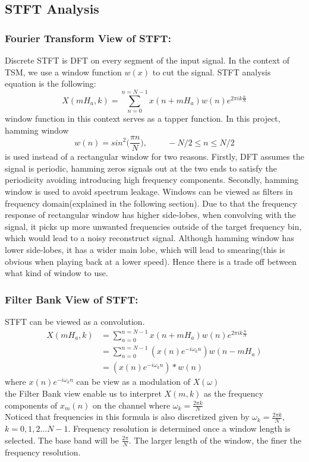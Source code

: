 \documentclass{article}
\begin{document}
\subsection{STFT Analysis}
\subsubsection{Fourier Transform View of STFT:}
Discrete STFT is DFT on every segment of the input signal. In the context of TSM, we use a window function $w(x)$ to cut the signal. STFT analysis equation is the following:
\begin{equation}
        X(mH_a,k) = \sum_{n=0}^{n= N-1} x(n+mH_a) w(n) e^{2 \pi ik \frac{n}{N}} 
\end{equation}
window function in this context serves as a tapper function. In this project, hamming window 
\[
w(n) = sin^2\bigg(\frac{\pi n}{N} \bigg), \hspace{1cm} -N/2 \leq n \leq N/2
\]
is used instead of a rectangular window for two reasons. Firstly, DFT assumes the signal is periodic, hamming zeros signals out at the two ends to satisfy the periodicity avoiding introducing high frequency components. Secondly, hamming window is used to avoid spectrum leakage. Windows can be viewed as filters in frequency domain(explained in the following section). Due to that the frequency response of rectangular window has higher side-lobes, when convolving with the signal, it picks up more unwanted frequencies outside of the target frequency bin, which would lead to a noisy reconstruct signal. Although hamming window has lower side-lobes, it has a wider main lobe, which will lead to smearing(this is obvious when playing back at a lower speed). Hence there is a trade off between what kind of window to use.
\subsubsection{Filter Bank View of STFT:}
STFT can be viewed as a convolution.\\ 
\[
        \begin{aligned}
        X(mH_a,k) &= \sum_{n=0}^{n= N-1} x(n+mH_a) w(n) e^{2 \pi ik \frac{n}{N}}\\ 
                  &=\sum_{n=0}^{n=N-1}(x(n)e^{-i\omega_k n})w(n-mH_a)\\
                  &=  (x(n) e^{-i\omega_k n} )* w(n)
\end{aligned}
\]
where  $x(n) e^{-i\omega_k n}$ can be view as a modulation of $X(\omega)$\\
the Filter Bank view enable us to interpret $X(m,k)$ as the frequency components of $x_m(n)$ on the channel where $\omega_k=\frac{2\pi k}{N}$ \\ 
Noticed that frequencies in this formula is also discretized given by $\omega_{k} = \frac{2\pi k}{N}$, $k=0,1,2...N-1$. Frequency resolution is determined once a window length is selected. The base band will be $\frac{2\pi}{N}$. The larger length of the window, the finer the frequency resolution. 
\end{document}

